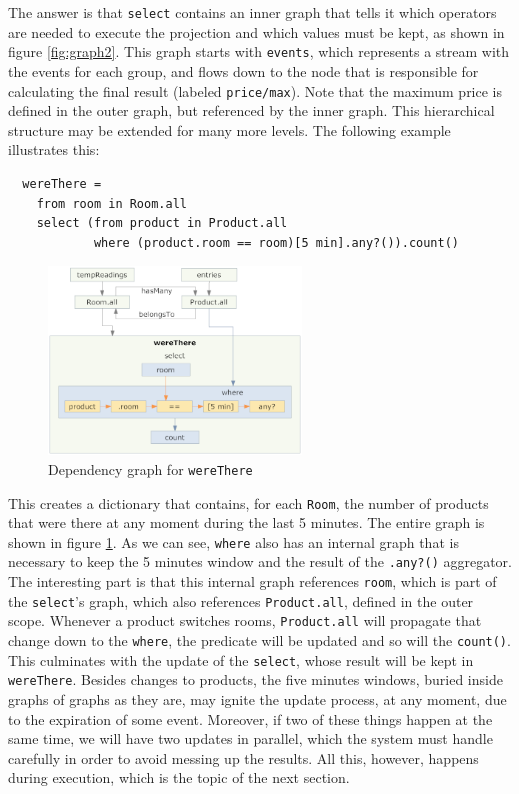 The answer is that \verb=select= contains an inner graph that tells it
which operators are needed to execute the projection and which values
must be kept, as shown in figure \ref{fig:graph2}. This graph starts
with \verb=events=, which represents a stream with the events for each
group, and flows down to the node that is responsible for calculating
the final result (labeled \verb=price/max=). Note that the maximum
price is defined in the outer graph, but referenced by the inner
graph. This hierarchical structure may be extended for many more
levels. The following example illustrates this:

\begin{lstlisting}
  wereThere =
    from room in Room.all
    select (from product in Product.all
            where (product.room == room)[5 min].any?()).count()
\end{lstlisting}

\begin{figure}[t]
  \centering
  \includegraphics[width=0.6\textwidth]{wereThere.png}
  \caption{Dependency graph for \tt{wereThere}}
  \label{fig:graph-wereThere}
\end{figure}

This creates a dictionary that contains, for each \verb=Room=, the
number of products that were there at any moment during the last 5
minutes. The entire graph is shown in figure
\ref{fig:graph-wereThere}. As we can see, \verb=where= also has an
internal graph that is necessary to keep the 5 minutes window and the
result of the \verb=.any?()= aggregator. The interesting part is that
this internal graph references \verb=room=, which is part of the
\verb=select='s graph, which also references \verb=Product.all=,
defined in the outer scope. Whenever a product switches rooms,
\verb=Product.all= will propagate that change down to the
\verb=where=, the predicate will be updated and so will the
\verb=count()=. This culminates with the update of the \verb=select=,
whose result will be kept in \verb=wereThere=. Besides changes to
products, the five minutes windows, buried inside graphs of graphs as
they are, may ignite the update process, at any moment, due to the
expiration of some event. Moreover, if two of these things happen at
the same time, we will have two updates in parallel, which the system
must handle carefully in order to avoid messing up the results. All
this, however, happens during execution, which is the topic of the
next section.

